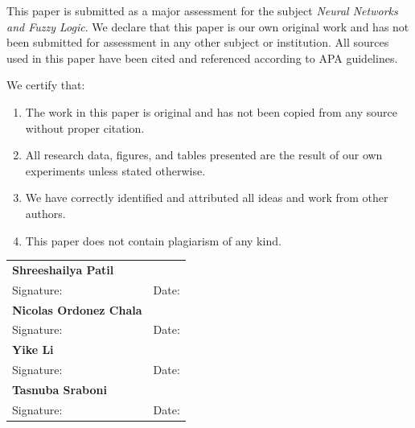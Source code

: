\documentclass[12pt, a4paper]{article}
\begin{document}
This paper is submitted as a major assessment for the subject \textit{Neural Networks and Fuzzy Logic}. We declare that this paper is our own original work and has not been submitted for assessment in any other subject or institution. All sources used in this paper have been cited and referenced according to APA guidelines.

\vspace{0.5em}

We certify that:
\begin{enumerate}
\item The work in this paper is original and has not been copied from any source without proper citation.
\item All research data, figures, and tables presented are the result of our own experiments unless stated otherwise.
\item We have correctly identified and attributed all ideas and work from other authors.
\item This paper does not contain plagiarism of any kind.
\end{enumerate}

\vspace{2em}

\begin{tabular}{p{7cm} p{5cm}}
\textbf{Shreeshailya Patil}                                & \\[1.5em]
Signature: \underline{\hspace{4cm}} & Date: \underline{\hspace{2.5cm}}\\[2em]
\textbf{Nicolas Ordonez Chala}                             & \\[1.5em]
Signature: \underline{\hspace{4cm}} & Date: \underline{\hspace{2.5cm}}\\[2em]
\textbf{Yike Li}                                           & \\[1.5em]
Signature: \underline{\hspace{4cm}} & Date: \underline{\hspace{2.5cm}}\\[2em]
\textbf{Tasnuba Sraboni}                                   & \\[1.5em]
Signature: \underline{\hspace{4cm}} & Date: \underline{\hspace{2.5cm}}\\[2em]
\end{tabular}
\end{document}
